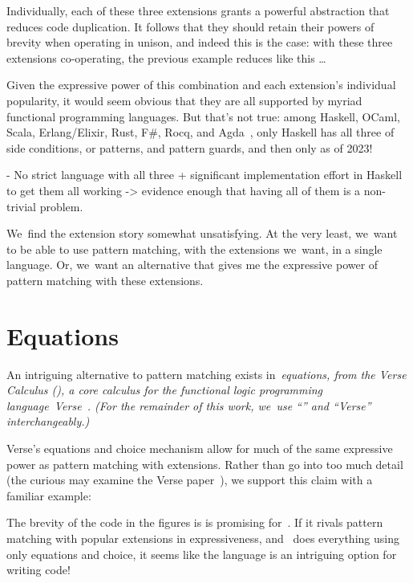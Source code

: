 \documentclass[article,screen,12pt, nonacm]{acmart}
\begin{document}
    \newpage
    Individually, each of these three extensions grants a powerful abstraction
    that reduces code duplication. It follows that they should retain their
    powers of brevity when operating in unison, and indeed this is the case:
    with these three extensions co-operating, the previous example reduces like
    this \dots

    Given the expressive power of this combination and each extension's
    individual popularity, it would seem obvious that they are all supported by
    myriad functional programming languages. But that's not true: among Haskell,
    OCaml, Scala, Erlang/Elixir, Rust, F\#, Rocq, and Agda~\citep{haskell,
    ocaml, scala, erlang, elixir, rust, fsharp, agda}, only Haskell has all
    three of side conditions, or patterns, and pattern guards, and then only as
    of 2023! 

    - No strict language with all three + significant implementation effort in
    Haskell to get them all working -> evidence enough that having all of them
    is a non-trivial problem. 
    
    We~find the extension story somewhat unsatisfying. At the very least,
    we~want to be able to use pattern matching, with the extensions we~want, in
    a single language. Or, we~want an alternative that gives me the expressive
    power of pattern matching with these extensions. 

    \section{Equations}

    An intriguing alternative to pattern matching exists in~\it{equations}, from
    the Verse Calculus (\VC), a core calculus for the functional logic
    programming language~\it{Verse}~\citep{antoy2010functional,
    hanus2013functional, verse}. (For the remainder of this work, we~use “\VC”
    and “Verse” interchangeably.)

    Verse's equations and choice mechanism allow for much of the same expressive
    power as pattern matching with extensions. Rather than go into too much
    detail (the curious may examine the Verse paper~\citep{verse}), we support
    this claim with a familiar example: 


    The brevity of the code in the figures is is promising for~\VC. If it rivals
    pattern matching with popular extensions in expressiveness, and~\VC
    does everything using only equations and choice, it seems like the language
    is an intriguing option for writing code! 
\end{document}
